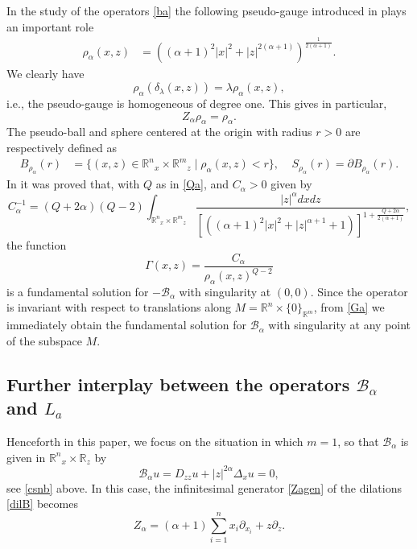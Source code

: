 \documentclass[11pt]{amsart}
\theoremstyle{plain}
\numberwithin{equation}{section}
\begin{document}
In the study of the operators \eqref{ba} the following pseudo-gauge introduced in \cite{G} plays an important role
\begin{align}\label{ra}
 \rho_\alpha(x,z) & = \left((\alpha+1)^2 |x|^2 + |z|^{2(\alpha+1)}\right)^{\frac1{2(\alpha+1)}}.
\end{align}
We clearly have
\begin{equation}\label{gaugehom}
\rho_\alpha(\delta_{\lambda}(x,z)) = \lambda \rho_\alpha(x,z),
\end{equation}
i.e., the pseudo-gauge is homogeneous of degree one. This gives in particular,
\[
Z_\alpha \rho_\alpha = \rho_\alpha.
\]
The pseudo-ball and sphere centered at the origin with radius $r>0$ are respectively defined as
\begin{align}\label{BSr}
 B_{\rho_\alpha}(r)&=\{(x,z)\in {\mathbb R^n}_x\times {\mathbb R^m}_z \mid \rho_\alpha(x,z)<r\},\ \ \ \ \ S_{\rho_\alpha}(r) = {\partial} B_{\rho_\alpha}(r).
\end{align}
In \cite{G} it was proved that, with $Q$ as in \eqref{Qa}, and $C_\alpha>0$ given by
\[
C_\alpha^{-1} = (Q + 2\alpha)(Q-2) \int_{{\mathbb R^n}_x\times {\mathbb R^m}_z} \frac{|z|^{\alpha} dx dz}{\left[((\alpha +1)^2 |x|^2 + |z|^{\alpha+1} + 1)\right]^{1 +\frac{Q+2\alpha}{2(\alpha+1)}}},
\]
 the function
\begin{equation}\label{Ga}
 \Gamma(x,z)=\frac{C_{\alpha}}{{\rho_\alpha}(x,z)^{Q-2}}
\end{equation}
is a fundamental solution for $-{\mathcal{B}_\alpha}$ with singularity at $(0,0)$. Since the operator is invariant with respect to translations along $M = {\mathbb R^n} \times  \{0\}_{{\mathbb R}^m} $, from \eqref{Ga} we immediately obtain the fundamental solution for ${\mathcal{B}_\alpha}$ with singularity at any point of the subspace $M$.

\subsection{Further interplay between the operators ${\mathcal{B}_\alpha}$ and $L_a$}\label{S:fi}

Henceforth in this paper, we focus on the situation in which $m=1$, so that ${\mathcal{B}_\alpha}$ is given in ${\mathbb R^n}_x\times {\mathbb R}_z$ by
\begin{equation}\label{bg}
{\mathcal{B}_\alpha} u = D_{zz} u + |z|^{2\alpha} \Delta_x u = 0,
\end{equation}
see \eqref{csnb} above. In this case, the infinitesimal generator \eqref{Zagen} of the dilations \eqref{dilB} becomes
\begin{equation}\label{Za}
 Z_\alpha= (\alpha+1)\sum_{i=1}^n x_i \partial_{x_i} +  z\partial_{z}.
\end{equation}
\end{document}
